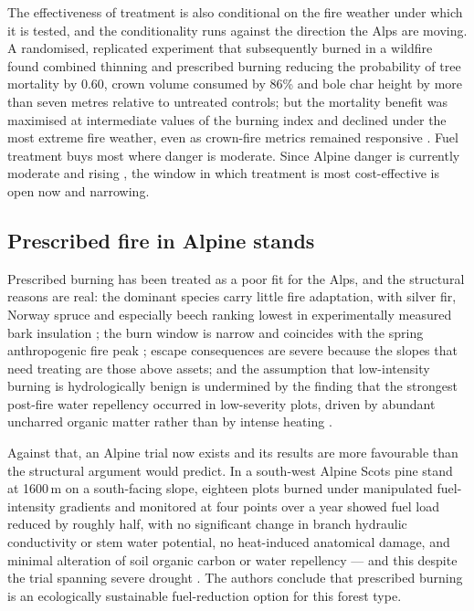 \documentclass[11pt,a4paper]{article}
\begin{document}
The effectiveness of treatment is also conditional on the fire weather under which it is tested, and the conditionality runs against the direction the Alps are moving. A randomised, replicated experiment that subsequently burned in a wildfire found combined thinning and prescribed burning reducing the probability of tree mortality by 0.60, crown volume consumed by 86\% and bole char height by more than seven metres relative to untreated controls; but the mortality benefit was maximised at intermediate values of the burning index and declined under the most extreme fire weather, even as crown-fire metrics remained responsive \citep{brodie_forest_2024}. Fuel treatment buys most where danger is moderate. Since Alpine danger is currently moderate and rising \citep{gerberding_mapping_2025, miller_climate_2024}, the window in which treatment is most cost-effective is open now and narrowing.

\subsection{Prescribed fire in Alpine stands}

Prescribed burning has been treated as a poor fit for the Alps, and the structural reasons are real: the dominant species carry little fire adaptation, with silver fir, Norway spruce and especially beech ranking lowest in experimentally measured bark insulation \citep{mutterer_bark_2026, dupire_vulnerability_2019}; the burn window is narrow and coincides with the spring anthropogenic fire peak \citep{muller_forest_2020}; escape consequences are severe because the slopes that need treating are those above assets; and the assumption that low-intensity burning is hydrologically benign is undermined by the finding that the strongest post-fire water repellency occurred in low-severity plots, driven by abundant uncharred organic matter rather than by intense heating \citep{negri_wildfire_2026}.

Against that, an Alpine trial now exists and its results are more favourable than the structural argument would predict. In a south-west Alpine Scots pine stand at 1600\,m on a south-facing slope, eighteen plots burned under manipulated fuel-intensity gradients and monitored at four points over a year showed fuel load reduced by roughly half, with no significant change in branch hydraulic conductivity or stem water potential, no heat-induced anatomical damage, and minimal alteration of soil organic carbon or water repellency --- and this despite the trial spanning severe drought \citep{gamba_prescribed_2025}. The authors conclude that prescribed burning is an ecologically sustainable fuel-reduction option for this forest type.
\end{document}
